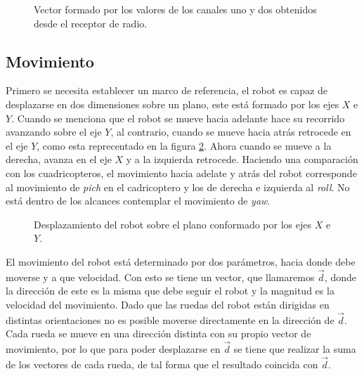 \documentclass{iccmemoria}
\begin{document}
\begin{figure}[H]
  \centering
  \selectfont{
  
  }
  \caption[Vector formado por las entradas de radio]{Vector formado por los valores de los canales uno y dos obtenidos desde el receptor de radio.}
  \label{fig:radio_values}
\end{figure}

\subsection{Movimiento}

Primero se necesita establecer un marco de referencia, el robot es capaz de desplazarse en dos dimensiones sobre un plano, este está formado por los ejes $X$ e $Y$. Cuando se menciona que el robot se mueve hacia adelante hace su recorrido avanzando sobre el eje $Y$, al contrario, cuando se mueve hacia atrás retrocede en el eje $Y$, como esta reprecentado en la figura \ref{fig:omni_direcition}. Ahora cuando se mueve a la derecha, avanza en el eje $X$ y a la izquierda retrocede. Haciendo una comparación con los cuadricopteros, el movimiento hacia adelate y atrás del robot corresponde al movimiento de \emph{pich} en el cadricoptero y los de derecha e izquierda al \emph{roll}. No está dentro de los alcances contemplar el movimiento de \emph{yaw}.\\

\begin{figure}[H]
  \centering
  \selectfont{
  
  }
  \caption[Desplazamiento del robot sobre el plano $XY$.]{Desplazamiento del robot sobre el plano conformado por los ejes $X$ e $Y$.}
  \label{fig:omni_direcition}
\end{figure}

El movimiento del robot está determinado por dos parámetros, hacia donde debe moverse y a que velocidad. Con esto se tiene un vector, que llamaremos $\vec{d}$, donde la dirección de este es la misma que debe seguir el robot y la magnitud es la velocidad del movimiento. Dado que las ruedas del robot están dirigidas en distintas orientaciones no es posible moverse directamente en la dirección de $\vec{d}$. Cada rueda se mueve en una dirección distinta con su propio vector de movimiento, por lo que para poder desplazarse en $\vec{d}$ se tiene que realizar la suma de los vectores de cada rueda, de tal forma que el resultado coincida con $\vec{d}$.\\
\end{document}
